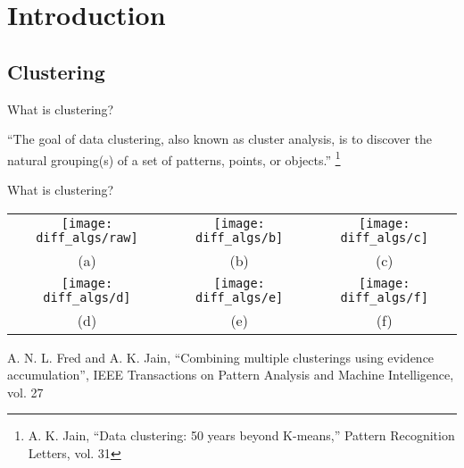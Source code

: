 
\section{Introduction}
\subsection{Clustering}

\begin{frame}{What is clustering?}

``The goal of data clustering, also known as cluster analysis, is to discover the natural grouping(s) of a set of patterns, points, or objects.''
\footnote{A. K. Jain, “Data clustering: 50 years beyond K-means,” Pattern Recognition Letters, vol. 31}

\end{frame}
        




\begin{frame}{What is clustering?}
\centering
\begin{tabular}{ccc}
  \texttt{[image: diff\_algs/raw]} &   \texttt{[image: diff\_algs/b]} & \texttt{[image: diff\_algs/c]}  \\

  {\tiny (a)} & {\tiny (b)} & {\tiny (c)} \\

  \texttt{[image: diff\_algs/d]} &  \texttt{[image: diff\_algs/e]} &  \texttt{[image: diff\_algs/f]}\\

  {\tiny (d)} & {\tiny (e)} & {\tiny (f)}

\end{tabular}
{\fontsize{5.5}{5.5} \selectfont A. N. L. Fred and A. K. Jain, “Combining multiple clusterings using evidence accumulation”, IEEE Transactions on Pattern Analysis and Machine Intelligence, vol. 27}

\end{frame}


